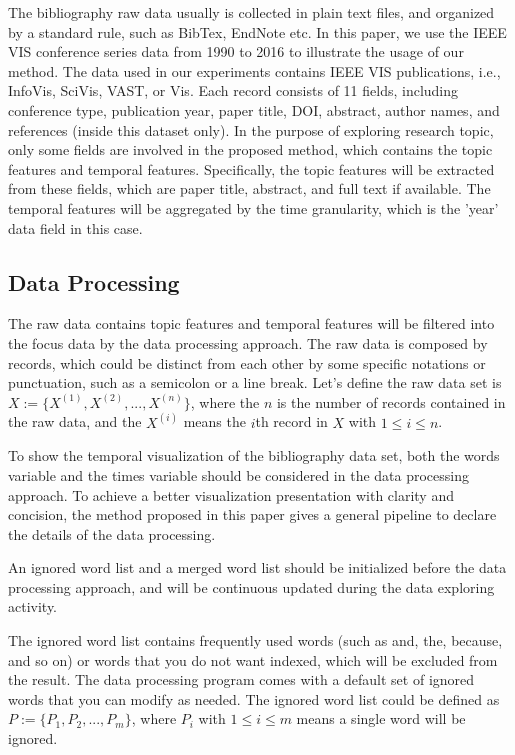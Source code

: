 \documentclass[12pt]{iopart}
\begin{document}
The bibliography raw data usually is collected in plain text files, and organized by a standard rule, such as BibTex, EndNote etc. In this paper, we use the IEEE VIS conference series data\cite{Isenberg:2016ika} from 1990 to 2016 to illustrate the usage of our method. The data used in our experiments contains IEEE VIS publications, i.e., InfoVis, SciVis, VAST, or Vis. Each record consists of 11 fields, including conference type, publication year, paper title, DOI, abstract, author names, and references (inside this dataset only). In the purpose of exploring research topic, only some fields are involved in the proposed method, which contains the topic features and temporal features. Specifically, the topic features will be extracted from these fields, which are paper title, abstract, and full text if available. The temporal features will be aggregated by the time granularity, which is the 'year' data field in this case. 

\subsection{Data Processing}

The raw data contains topic features and temporal features will be filtered into the focus data by the data processing approach. The raw data is composed by records, which could be distinct from each other by some specific notations or punctuation, such as a semicolon or a line break. Let's define the raw data set is $X := \{X^{(1)},X^{(2)},...,X^{(n)}\}$, where the $n$ is the number of records contained in the raw data, and the $X^{(i)}$ means the $i$th record in $X$ with $1 \leq i \leq n$. 

To show the temporal visualization of the bibliography data set, both the words variable and the times variable should be considered in the data processing approach. To achieve a better visualization presentation with clarity and concision, the method proposed in this paper gives a general pipeline to declare the details of the data processing. 

An ignored word list and a merged word list should be initialized before the data processing approach, and will be continuous updated during the data exploring activity. 

The ignored word list contains frequently used words (such as and, the, because, and so on) or words that you do not want indexed, which will be excluded from the result. The data processing program comes with a default set of ignored words that you can modify as needed. The ignored word list could be defined as $ P := \{P_1,P_2,...,P_m\} $, where $P_i$ with $1 \leq i \leq m$ means a single word will be ignored. 
\end{document}
